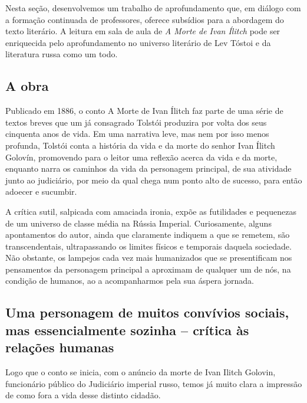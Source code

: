 \documentclass[12pt]{extarticle}
\begin{document}
Nesta seção, desenvolvemos um trabalho de aprofundamento que, em diálogo
com a formação continuada de professores, oferece subsídios para a
abordagem do texto literário. A leitura em sala de aula de \emph{A Morte
de Ivan Ílitch} pode ser enriquecida pelo aprofundamento no universo
literário de Lev Tóstoi e da literatura russa como um todo.




\subsection{A obra}

Publicado em 1886, o conto A Morte de Ivan Ílitch faz parte de uma série
de textos breves que um já consagrado Tolstói produzira por volta dos
seus cinquenta anos de vida. Em uma narrativa leve, mas nem por isso
menos profunda, Tolstói conta a história da vida e da morte do senhor
Ivan Ílitch Golovín, promovendo para o leitor uma reflexão acerca da
vida e da morte, enquanto narra os caminhos da vida da personagem
principal, de sua atividade junto ao judiciário, por meio da qual chega
num ponto alto de sucesso, para então adoecer e sucumbir.




A crítica sutil, salpicada com amaciada ironia, expõe as futilidades e
pequenezas de um universo de classe média na Rússia Imperial.
Curiosamente, alguns apontamentos do autor, ainda que claramente
indiquem a que se remetem, são transcendentais, ultrapassando os limites
físicos e temporais daquela sociedade. Não obstante, os lampejos cada
vez mais humanizados que se presentificam nos pensamentos da personagem
principal a aproximam de qualquer um de nós, na condição de humanos, ao
a acompanharmos pela sua áspera jornada.

\subsection{Uma personagem de muitos convívios sociais, mas essencialmente
sozinha -- crítica às relações humanas}

Logo que o conto se inicia, com o anúncio da morte de Ivan Ilitch
Golovin, funcionário público do Judiciário imperial russo, temos já
muito clara a impressão de como fora a vida desse distinto cidadão.
\end{document}
